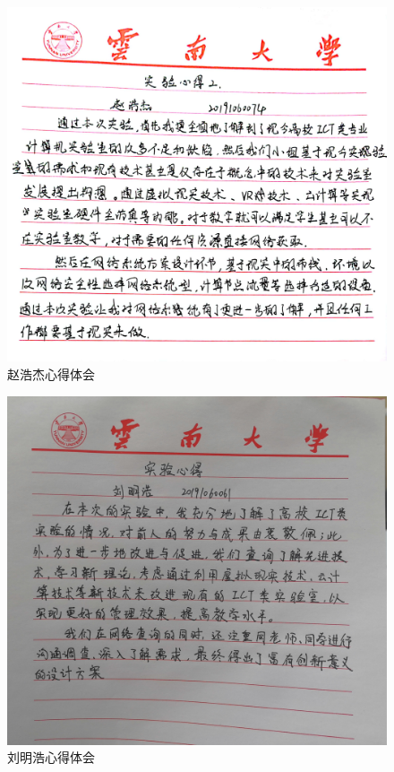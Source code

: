 \documentclass{imutthesis}
\begin{document}
\begin{figure}[h]
    \centering
        \centering
        \includegraphics[width=15cm]{赵浩杰.jpg}
        \caption{赵浩杰心得体会}
\end{figure}

\begin{figure}[h]
    \centering
        \centering
        \includegraphics[width=15cm]{lmh.jpg}
        \caption{刘明浩心得体会}
\end{figure}
\end{document}
